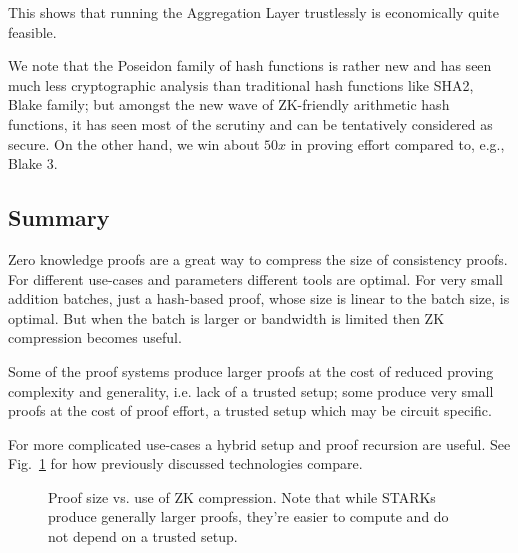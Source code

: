 \documentclass[twocolumn]{article}
\begin{document}
This shows that running the Aggregation Layer trustlessly is economically quite feasible.

We note that the Poseidon family of hash functions is rather new and has seen much less cryptographic analysis than traditional hash functions like SHA2, Blake family; but amongst the new wave of ZK-friendly arithmetic hash functions, it has seen most of the scrutiny and can be tentatively considered as secure. On the other hand, we win about $50x$ in proving effort compared to, e.g., Blake 3.


\subsection{Summary}

Zero knowledge proofs are a great way to compress the size of consistency proofs. For different use-cases and parameters different tools are optimal. For very small addition batches, just a hash-based proof, whose size is linear to the batch size, is optimal. But when the batch is larger or bandwidth is limited then ZK compression becomes useful.

Some of the proof systems produce larger proofs at the cost of reduced proving complexity and generality, i.e. lack of a trusted setup; some produce very small proofs at the cost of proof effort, a trusted setup which may be circuit specific.

For more complicated use-cases a hybrid setup and proof recursion are useful. See Fig.~\ref{fig:comp} for how previously discussed technologies compare.

\begin{figure}[!htbp]
    \centering
{}
    \caption{Proof size vs. use of ZK compression. Note that while STARKs produce generally larger proofs, they're easier to compute and do not depend on a trusted setup.}\label{fig:comp}
\end{figure}
\end{document}
